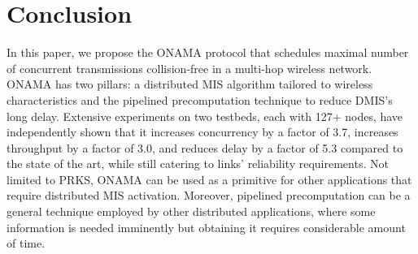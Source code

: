 \documentclass[conference]{IEEEtran}
\begin{document}
 \section{Conclusion}		\label{section:conclusion}
In this paper, we propose the ONAMA protocol that schedules maximal number of concurrent transmissions collision-free in a multi-hop wireless network. ONAMA has two pillars: a distributed MIS algorithm tailored to wireless characteristics and the pipelined precomputation technique to reduce DMIS's long delay. Extensive experiments on two testbeds, each with 127+ nodes, have independently shown that it increases concurrency by a factor of 3.7, increases throughput by a factor of 3.0, and reduces delay by a factor of 5.3 compared to the state of the art, while still catering to links' reliability requirements. 
Not limited to PRKS, ONAMA can be used as a primitive for other applications that require distributed MIS activation. Moreover, pipelined precomputation can be a general technique employed by other distributed applications, where some information is needed imminently but obtaining it requires considerable amount of time.
 










































\end{document}
